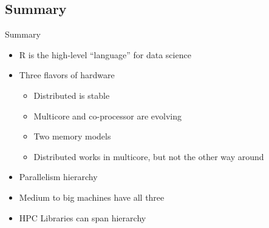 \subsection{Summary}
\makesubcontentsslidessec

\begin{frame}
  \begin{block}{Summary}
    \begin{itemize}
    \item R is the high-level ``language'' for data science
    \item Three flavors of hardware
      \begin{itemize}
      \item Distributed is stable
      \item Multicore and co-processor are evolving
      \item Two memory models
      \item Distributed works in multicore, but not the other way around
      \end{itemize}
    \item Parallelism hierarchy
    \item Medium to big machines have all three
    \item HPC Libraries can span hierarchy
    \end{itemize}
  \end{block}
\end{frame}